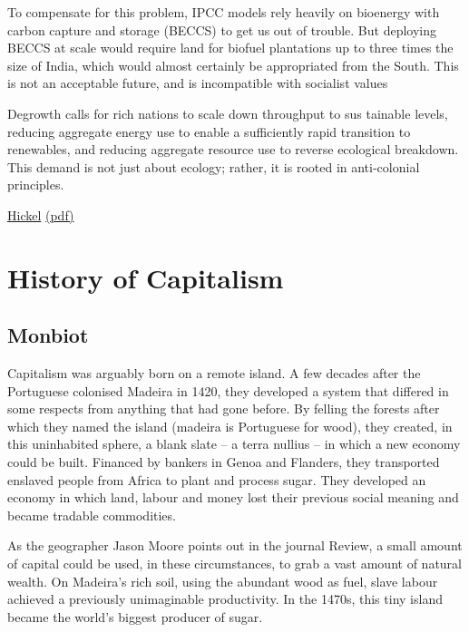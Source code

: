 \documentclass[
]{book}
\begin{document}
To compensate for this problem, IPCC models rely heavily on bioenergy
with carbon capture and storage (BECCS) to get us out of trouble. But
deploying BECCS at scale would require land for biofuel plantations up
to three times the size of India, which would almost certainly be
appropriated from the South. This is not an acceptable future, and is
incompatible with socialist values

Degrowth calls for rich nations to scale down throughput to sus­
tainable levels, reducing aggregate energy use to enable a sufficiently
rapid transition to renewables, and reducing aggregate resource use to
reverse ecological breakdown. This demand is not just about ecology;
rather, it is rooted in anti-colonial principles.

\href{https://www.sciencedirect.com/science/article/pii/S0962629821000640}{Hickel}
\href{pdf/Hickel_2021_Anti-colonial_degrowth.pdf}{(pdf)}

\hypertarget{history-of-capitalism}{%
\chapter{History of Capitalism}\label{history-of-capitalism}}

\hypertarget{monbiot}{%
\section{Monbiot}\label{monbiot}}

Capitalism was arguably born on a remote island. A few decades after the Portuguese colonised Madeira in 1420, they developed a system that differed in some respects from anything that had gone before. By felling the forests after which they named the island (madeira is Portuguese for wood), they created, in this uninhabited sphere, a blank slate -- a terra nullius -- in which a new economy could be built. Financed by bankers in Genoa and Flanders, they transported enslaved people from Africa to plant and process sugar. They developed an economy in which land, labour and money lost their previous social meaning and became tradable commodities.

As the geographer Jason Moore points out in the journal Review, a small amount of capital could be used, in these circumstances, to grab a vast amount of natural wealth. On Madeira's rich soil, using the abundant wood as fuel, slave labour achieved a previously unimaginable productivity. In the 1470s, this tiny island became the world's biggest producer of sugar.
\end{document}

